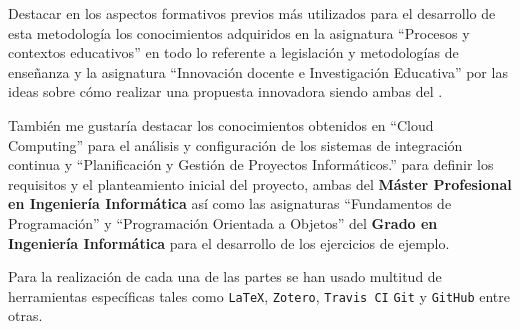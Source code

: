 Destacar en los aspectos formativos previos más utilizados para el desarrollo de esta metodología los conocimientos adquiridos en la asignatura ``Procesos y contextos educativos'' en todo lo referente a legislación y metodologías de enseñanza y la asignatura ``Innovación docente e Investigación Educativa'' por las ideas sobre cómo realizar una propuesta innovadora siendo ambas del \textbf{\master}.

\bigskip
También me gustaría destacar los conocimientos obtenidos en ``Cloud Computing'' para el análisis y configuración de los sistemas de integración continua y ``Planificación y Gestión de Proyectos Informáticos.'' para definir los requisitos y el planteamiento inicial del proyecto, ambas del \textbf{Máster Profesional en Ingeniería Informática} así como las asignaturas ``Fundamentos de Programación'' y ``Programación Orientada a Objetos'' del \textbf{Grado en Ingeniería Informática} para el desarrollo de los ejercicios de ejemplo.

\bigskip
Para la realización de cada una de las partes se han usado multitud de herramientas específicas tales como \texttt{LaTeX}, \texttt{Zotero}, \texttt{Travis CI} \texttt{Git} y \texttt{GitHub} entre otras.
